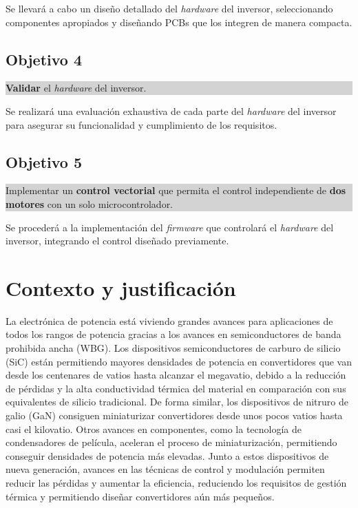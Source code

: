 Se llevará a cabo un diseño detallado del \textit{hardware} del inversor, seleccionando componentes apropiados y diseñando PCBs que los integren de manera compacta.

\subsection*{Objetivo 4}
\colorbox{lightgray}{%
	\parbox{\dimexpr\linewidth-2\fboxsep-2\fboxrule}{%
		\textbf{Validar} el \textit{hardware} del inversor.%
	}%
}

Se realizará una evaluación exhaustiva de cada parte del \textit{hardware} del inversor para asegurar su funcionalidad y cumplimiento de los requisitos.

\subsection*{Objetivo 5}
\colorbox{lightgray}{%
	\parbox{\dimexpr\linewidth-2\fboxsep-2\fboxrule}{%
		Implementar un \textbf{control vectorial} que permita el control independiente de \textbf{dos motores} con un solo microcontrolador.%
	}%
}

Se procederá a la implementación del \textit{firmware} que controlará el \textit{hardware} del inversor, integrando el control diseñado previamente.

\section{Contexto y justificación}

La electrónica de potencia está viviendo grandes avances para aplicaciones de todos los rangos de potencia gracias a los avances en semiconductores de banda prohibida ancha (WBG). Los dispositivos semiconductores de carburo de silicio (SiC) están permitiendo mayores densidades de potencia en convertidores que van desde los centenares de vatios hasta alcanzar el megavatio, debido a la reducción de pérdidas y la alta conductividad térmica del material en comparación con sus equivalentes de silicio tradicional. De forma similar, los dispositivos de nitruro de galio (GaN) consiguen miniaturizar convertidores desde unos pocos vatios hasta casi el kilovatio. Otros avances en componentes, como la tecnología de condensadores de película, aceleran el proceso de miniaturización, permitiendo conseguir densidades de potencia más elevadas. Junto a estos dispositivos de nueva generación, avances en las técnicas de control y modulación permiten reducir las pérdidas y aumentar la eficiencia, reduciendo los requisitos de gestión térmica y permitiendo diseñar convertidores aún más pequeños.

